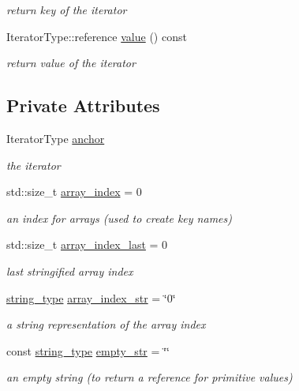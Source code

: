 \begin{DoxyCompactItemize}
\begin{DoxyCompactList}\small\item\em return key of the iterator \end{DoxyCompactList}\item 
Iterator\+Type\+::reference \hyperlink{classnlohmann_1_1detail_1_1iteration__proxy__value_ad2fa3bf4e2598666dbf8d1b77c17d003}{value} () const 
\begin{DoxyCompactList}\small\item\em return value of the iterator \end{DoxyCompactList}\end{DoxyCompactItemize}
\subsection*{Private Attributes}
\begin{DoxyCompactItemize}
\item 
Iterator\+Type \hyperlink{classnlohmann_1_1detail_1_1iteration__proxy__value_a073741b6536b7a5166467a5515bc59cb}{anchor}
\begin{DoxyCompactList}\small\item\em the iterator \end{DoxyCompactList}\item 
std\+::size\+\_\+t \hyperlink{classnlohmann_1_1detail_1_1iteration__proxy__value_ad3d18c83aff5e9f4bdbf99385b29a39a}{array\+\_\+index} = 0
\begin{DoxyCompactList}\small\item\em an index for arrays (used to create key names) \end{DoxyCompactList}\item 
std\+::size\+\_\+t \hyperlink{classnlohmann_1_1detail_1_1iteration__proxy__value_aac6e7cc0c17242a0a42c14d1e714747c}{array\+\_\+index\+\_\+last} = 0
\begin{DoxyCompactList}\small\item\em last stringified array index \end{DoxyCompactList}\item 
\hyperlink{classnlohmann_1_1detail_1_1iteration__proxy__value_a1fc63b88a585fa39942007aab69a74e6}{string\+\_\+type} \hyperlink{classnlohmann_1_1detail_1_1iteration__proxy__value_ab0b34133f45a3610070492d32978f2ea}{array\+\_\+index\+\_\+str} = \char`\"{}0\char`\"{}
\begin{DoxyCompactList}\small\item\em a string representation of the array index \end{DoxyCompactList}\item 
const \hyperlink{classnlohmann_1_1detail_1_1iteration__proxy__value_a1fc63b88a585fa39942007aab69a74e6}{string\+\_\+type} \hyperlink{classnlohmann_1_1detail_1_1iteration__proxy__value_a298dae04e3c0a64719752c16754d1d71}{empty\+\_\+str} = \char`\"{}\char`\"{}
\begin{DoxyCompactList}\small\item\em an empty string (to return a reference for primitive values) \end{DoxyCompactList}\end{DoxyCompactItemize}


